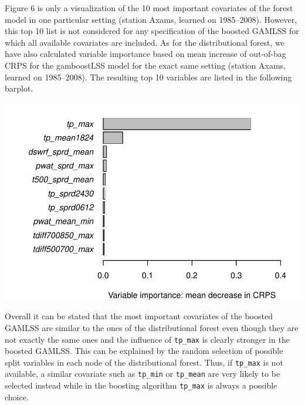 \documentclass[american,foldmarks=false,noconfig]{uibklttr}
\begin{document}
Figure 6 is only a visualization of the 10 most important covariates 
of the forest model in one particular setting (station Axams, learned 
on 1985--2008). However, this top 10 list is not considered for any specification 
of the boosted GAMLSS for which all available covariates are included. As 
for the distributional forest, we have also calculated variable importance 
based on mean increase of out-of-bag CRPS for the gamboostLSS model for 
the exact same setting (station Axams, learned on 1985--2008). The resulting 
top 10 variables are listed in the following barplot.

\begin{center}
\includegraphics[width = .7\textwidth]{varimp_gb.pdf}
\end{center}

Overall it can be stated that the most important covariates of the boosted 
GAMLSS are similar to the ones of the distributional forest even though they
are not exactly the same ones and the influence of \texttt{tp\_max} is clearly
stronger in the boosted GAMLSS. This can be explained by the random selection
of possible split variables in each node of the distributional forest. Thus,
if \texttt{tp\_max} is not available, a similar covariate such as \texttt{tp\_min}
or \texttt{tp\_mean} are very likely to be selected instead while in the boosting
algorithm \texttt{tp\_max} is always a possible choice.


\end{document}
